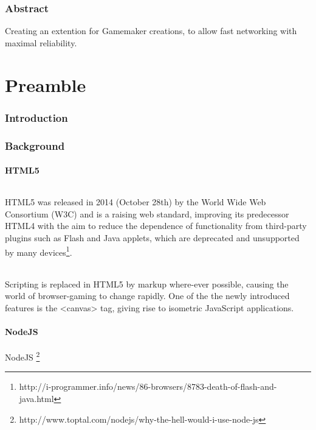 \documentclass[12pt]{article}
\begin{document}
\section*{Abstract}
Creating an extention for Gamemaker creations, to allow fast networking with maximal reliability.
\pagebreak

\tableofcontents
\pagebreak

\part{Preamble}
\pagebreak

\section{Introduction}

\section{Background}

\subsection{HTML5}

\paragraph{}HTML5 was released in 2014 (October 28th) by the World Wide Web Consortium (W3C) and is a raising web standard, improving its predecessor HTML4 with the aim to reduce the dependence of functionality from third-party plugins such as Flash and Java applets, which are deprecated and unsupported by many devices\footnote{http://i-programmer.info/news/86-browsers/8783-death-of-flash-and-java.html}.
\paragraph{}Scripting is replaced in HTML5 by markup where-ever possible, causing the world of browser-gaming to change rapidly. One of the the newly introduced features is the <canvas> tag, giving rise to isometric JavaScript applications.


\subsection{NodeJS}
NodeJS \footnote{http://www.toptal.com/nodejs/why-the-hell-would-i-use-node-js}
\end{document}
